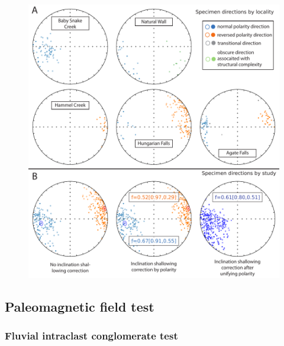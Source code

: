 \documentclass[draft]{agujournal2019}
\begin{document}
\begin{figure}[h!]
\centering
\includegraphics[width=\textwidth]{in_situ_pmag.pdf}
\caption{}
\label{fig:in_situ_pmag}
\end{figure}


\subsection*{Paleomagnetic field test}

\subsubsection*{Fluvial intraclast conglomerate test}
\end{document}
